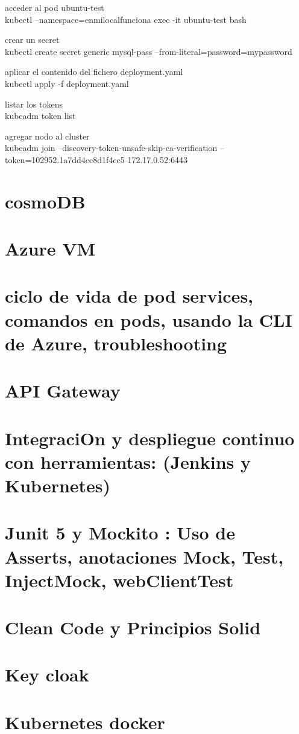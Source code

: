    acceder al pod ubuntu-test  \\
  kubectl --namespace=enmilocalfunciona exec -it ubuntu-test bash  
  
   crear un secret\\
  kubectl create secret generic mysql-pass --from-literal=password=mypassword 
  
   aplicar el contenido del fichero deployment.yaml  \\
  kubectl apply -f deployment.yaml 
  
   listar los tokens \\
  kubeadm token list  
  
   agregar nodo al cluster\\
  kubeadm join --discovery-token-unsafe-skip-ca-verification --token=102952.1a7dd4cc8d1f4cc5 172.17.0.52:6443  
  
\section{cosmoDB}
\section{Azure VM}
\section{ ciclo de vida de pod services, comandos en pods, usando la CLI de Azure, troubleshooting}
\section{API Gateway}
\section{IntegraciOn y despliegue continuo con herramientas: (Jenkins y Kubernetes)}
\section{ Junit 5 y Mockito : Uso de Asserts, anotaciones Mock, Test, InjectMock, webClientTest}
\section{Clean Code y Principios Solid}
\section{ Key cloak}
\section{Kubernetes docker}
